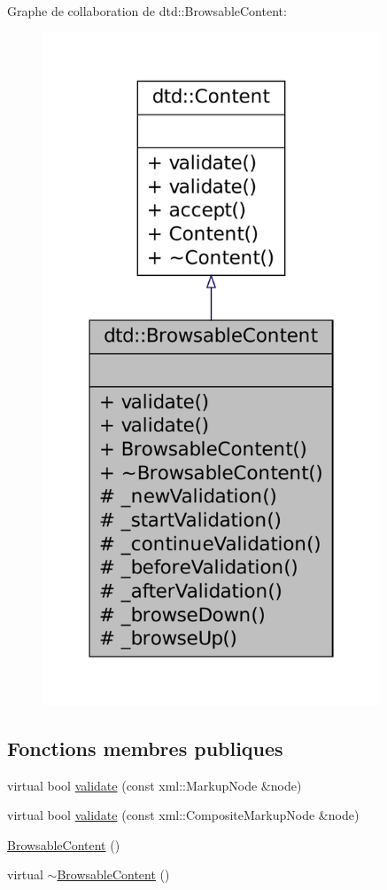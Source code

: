 Graphe de collaboration de dtd::BrowsableContent:\nopagebreak
\begin{figure}[H]
\begin{center}
\leavevmode
\includegraphics[width=286pt]{classdtd_1_1_browsable_content__coll__graph}
\end{center}
\end{figure}
\subsection*{Fonctions membres publiques}
\begin{DoxyCompactItemize}
\item 
virtual bool \hyperlink{classdtd_1_1_browsable_content_adbd9d013e126d5a1b601c3d781181bd4}{validate} (const xml::MarkupNode \&node)
\item 
virtual bool \hyperlink{classdtd_1_1_browsable_content_a824a0c41b66aeea689e4283ee453d398}{validate} (const xml::CompositeMarkupNode \&node)
\item 
\hyperlink{classdtd_1_1_browsable_content_a1f08c9ba0fa256b18ddbf473f3d7a868}{BrowsableContent} ()
\item 
virtual \hyperlink{classdtd_1_1_browsable_content_a0ccac4ea5cfbaf919b4a51b7b8537d0c}{$\sim$BrowsableContent} ()
\end{DoxyCompactItemize}
